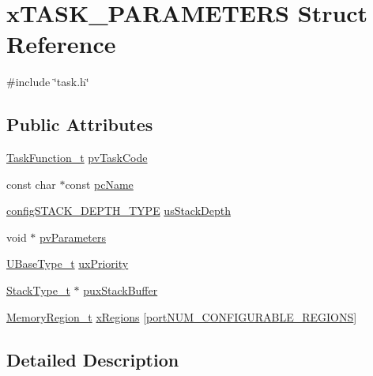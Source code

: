\hypertarget{structxTASK__PARAMETERS}{}\section{x\+T\+A\+S\+K\+\_\+\+P\+A\+R\+A\+M\+E\+T\+E\+RS Struct Reference}
\label{structxTASK__PARAMETERS}


{\ttfamily \#include \char`\"{}task.\+h\char`\"{}}

\subsection*{Public Attributes}
\begin{DoxyCompactItemize}
\item 
\hyperlink{projdefs_8h_a9b32502ff92c255c686dacde53c1cba0}{Task\+Function\+\_\+t} \hyperlink{structxTASK__PARAMETERS_a7527993402054565cda38251c8922880}{pv\+Task\+Code}
\item 
const char $\ast$const \hyperlink{structxTASK__PARAMETERS_a7b3e5583acf9de8bacac572a42246459}{pc\+Name}
\item 
\hyperlink{FreeRTOS_8h_ae4e85bffd36d76cf2796092f0ccd784a}{config\+S\+T\+A\+C\+K\+\_\+\+D\+E\+P\+T\+H\+\_\+\+T\+Y\+PE} \hyperlink{structxTASK__PARAMETERS_ac2edb442cd1a9dc5435c7735ed99c83e}{us\+Stack\+Depth}
\item 
void $\ast$ \hyperlink{structxTASK__PARAMETERS_accbb9f4de75b5b5be750198b52390c7f}{pv\+Parameters}
\item 
\hyperlink{pic32mx_2portmacro_8h_a646f89d4298e4f5afd522202b11cb2e6}{U\+Base\+Type\+\_\+t} \hyperlink{structxTASK__PARAMETERS_aa1aff14035db645e2bdcc85b3cdc9bab}{ux\+Priority}
\item 
\hyperlink{pic32mx_2portmacro_8h_a84e9a8ba132feed0b2401c1f4e2ac63c}{Stack\+Type\+\_\+t} $\ast$ \hyperlink{structxTASK__PARAMETERS_a946c525d3765369780538f9bc3f3586d}{pux\+Stack\+Buffer}
\item 
\hyperlink{task_8h_af609504de4d78ff6f71477ae47c66e51}{Memory\+Region\+\_\+t} \hyperlink{structxTASK__PARAMETERS_ae8b97c6b7a344bf09b066b0844844d66}{x\+Regions} \mbox{[}\hyperlink{portable_8h_aca7e1a8a568a38b74cc9db10c8efebda}{port\+N\+U\+M\+\_\+\+C\+O\+N\+F\+I\+G\+U\+R\+A\+B\+L\+E\+\_\+\+R\+E\+G\+I\+O\+NS}\mbox{]}
\end{DoxyCompactItemize}


\subsection{Detailed Description}


